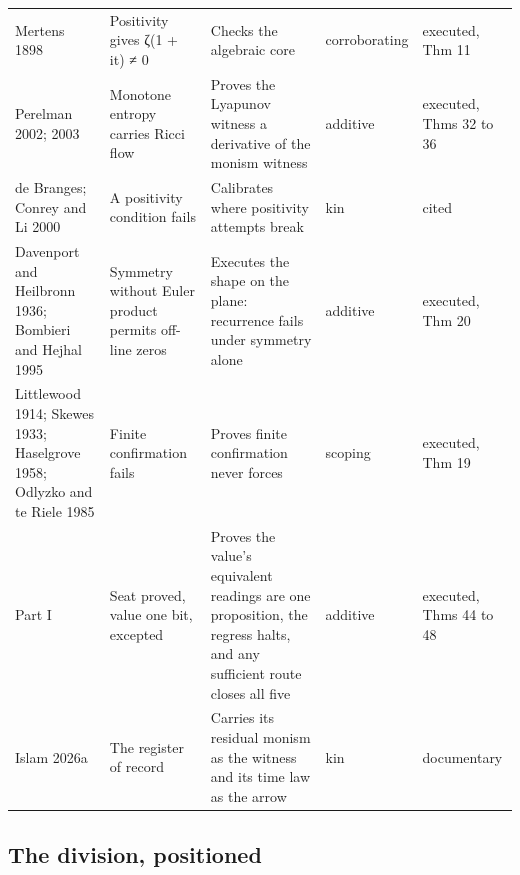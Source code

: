 \documentclass[10pt]{article}
\begin{document}
\begin{table}[!htbp]
\begin{tabularx}{\textwidth}{@{}P{0.18\textwidth} P{0.19\textwidth} L P{0.115\textwidth} P{0.115\textwidth}@{}}
Mertens 1898 & Positivity gives ζ(1 + it) ≠ 0 & Checks the algebraic core & corroborating & executed, Thm 11 \\
Perelman 2002; 2003 & Monotone entropy carries Ricci flow & Proves the Lyapunov witness a derivative of the monism witness & additive & executed, Thms 32 to 36 \\
de Branges; Conrey and Li 2000 & A positivity condition fails & Calibrates where positivity attempts break & kin & cited \\
Davenport and Heilbronn 1936; Bombieri and Hejhal 1995 & Symmetry without Euler product permits off-line zeros & Executes the shape on the plane: recurrence fails under symmetry alone & additive & executed, Thm 20 \\
Littlewood 1914; Skewes 1933; Haselgrove 1958; Odlyzko and te Riele 1985 & Finite confirmation fails & Proves finite confirmation never forces & scoping & executed, Thm 19 \\
Part I & Seat proved, value one bit, excepted & Proves the value's equivalent readings are one proposition, the regress halts, and any sufficient route closes all five & additive & executed, Thms 44 to 48 \\
Islam 2026a & The register of record & Carries its residual monism as the witness and its time law as the arrow & kin & documentary \\
\bottomrule
\end{tabularx}
\end{table}

\hypertarget{the-division-positioned}{%
\subsection{The division, positioned}\label{the-division-positioned}}
\end{document}
